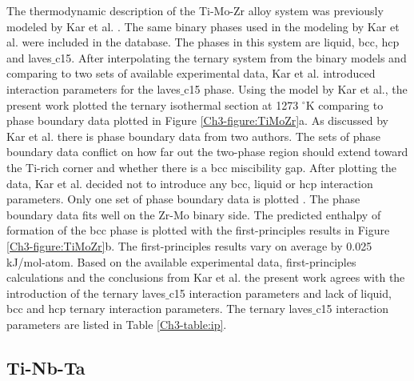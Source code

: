 The thermodynamic description of the Ti-Mo-Zr alloy system was previously modeled by Kar et al. \cite{Kar2008}. The same binary phases used in the modeling by Kar et al. were included in the database. The phases in this system are liquid, bcc, hcp and laves$\_$c15. After interpolating the ternary system from the binary models and comparing to two sets of available experimental data, Kar et al. introduced interaction parameters for the laves$\_$c15 phase. Using the model by Kar et al., the present work plotted the ternary isothermal section at 1273 $^\circ$K comparing to phase boundary data plotted in Figure \ref{Ch3-figure:TiMoZr}a. As discussed by Kar et al. there is phase boundary data from two authors. The sets of phase boundary data conflict on how far out the two-phase region should extend toward the Ti-rich corner and whether there is a bcc miscibility gap. After plotting the data, Kar et al. decided not to introduce any bcc, liquid or hcp interaction parameters. Only one set of phase boundary data is plotted \cite{Prokoshkin1967}. The phase boundary data fits well on the Zr-Mo binary side. The predicted enthalpy of formation of the bcc phase is plotted with the first-principles results in Figure \ref{Ch3-figure:TiMoZr}b. The first-principles results vary on average by 0.025 kJ/mol-atom. Based on the available experimental data, first-principles calculations and the conclusions from Kar et al. the present work agrees with the introduction of the ternary laves$\_$c15 interaction parameters and lack of liquid, bcc and hcp ternary interaction parameters. The ternary laves$\_$c15 interaction parameters are listed in Table \ref{Ch3-table:ip}.

\subsection{Ti-Nb-Ta}

